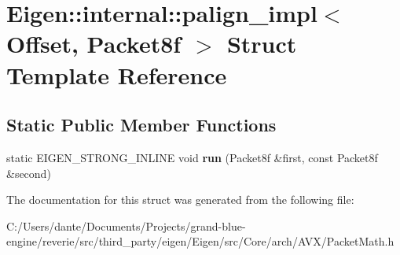 \hypertarget{struct_eigen_1_1internal_1_1palign__impl_3_01_offset_00_01_packet8f_01_4}{}\section{Eigen\+::internal\+::palign\+\_\+impl$<$ Offset, Packet8f $>$ Struct Template Reference}
\label{struct_eigen_1_1internal_1_1palign__impl_3_01_offset_00_01_packet8f_01_4}
\subsection*{Static Public Member Functions}
\begin{DoxyCompactItemize}
\item 
\mbox{\label{struct_eigen_1_1internal_1_1palign__impl_3_01_offset_00_01_packet8f_01_4_ab88632af1fe3faa1252771cf2d3fe770}} 
static E\+I\+G\+E\+N\+\_\+\+S\+T\+R\+O\+N\+G\+\_\+\+I\+N\+L\+I\+NE void {\bfseries run} (Packet8f \&first, const Packet8f \&second)
\end{DoxyCompactItemize}


The documentation for this struct was generated from the following file\+:\begin{DoxyCompactItemize}
\item 
C\+:/\+Users/dante/\+Documents/\+Projects/grand-\/blue-\/engine/reverie/src/third\+\_\+party/eigen/\+Eigen/src/\+Core/arch/\+A\+V\+X/Packet\+Math.\+h\end{DoxyCompactItemize}
